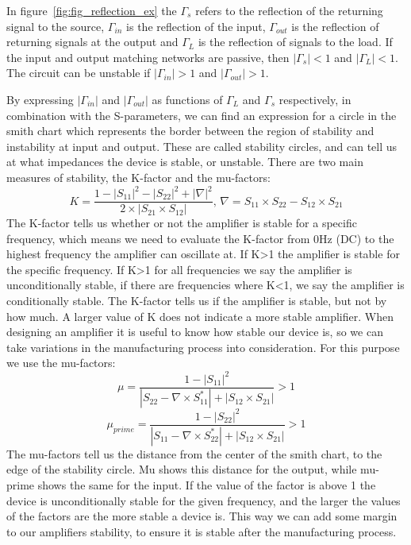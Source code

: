 In figure~\ref{fig:fig_reflection_ex} the $\Gamma_s$ refers to the reflection of the returning signal to the source, $\Gamma_{in}$ is the reflection of the input, $\Gamma_{out}$ is the reflection of returning signals at the output and $\Gamma_L$ is the reflection of signals to the load. If the input and output matching networks are passive, then $|\Gamma_s|<1$ and $|\Gamma_L|<1$. The circuit can be unstable if $|\Gamma_{in}|>1$ and $|\Gamma_{out}|>1$. 

By expressing $|\Gamma_{in}|$ and $|\Gamma_{out}|$ as functions of $\Gamma_L$  and $\Gamma_s$ respectively, in combination with the S-parameters, we can find an expression for a circle in the smith chart which represents the border between the region of stability and instability at input and output. These are called stability circles, and can tell us at what impedances the device is stable, or unstable.
There are two main measures of stability, the K-factor and the mu-factors:
\begin{equation}
K=\frac{1-|S_{11}|^2-|S_{22}|^2+|\nabla |^2}{2\times |S_{21}\times S_{12}|},\, \nabla =S_{11}\times S_{22}-S_{12}\times S_{21}
\end{equation}
The K-factor tells us whether or not the amplifier is stable for a specific frequency, which means we need to evaluate the K-factor from 0Hz (DC) to the highest frequency the amplifier can oscillate at. If K>1 the amplifier is stable for the specific frequency. If K>1 for all frequencies we say the amplifier is unconditionally stable, if there are frequencies where K<1, we say the amplifier is conditionally stable.  The K-factor tells us if the amplifier is stable, but not by how much. A larger value of K does not indicate a more stable amplifier. When designing an amplifier it is useful to know how stable our device is, so we can take variations in the manufacturing process into consideration. For this purpose we use the mu-factors:
\begin{equation}
\mu=\frac{1-|S_{11}|^2}{|S_{22}-\nabla \times S_{11}^*|+|S_{12}\times S_{21}|}>1
\end{equation}
\begin{equation}
\mu_{prime}=\frac{1-|S_{22}|^2}{|S_{11}-\nabla \times S_{22}^*|+|S_{12}\times S_{21}|}>1
\end{equation}
The mu-factors tell us the distance from the center of the smith chart, to the edge of the stability circle. Mu shows this distance for the output, while mu-prime shows the same for the input. If the value of the factor is above 1 the device is unconditionally stable for the given frequency, and the larger the values of the factors are the more stable a device is. This way we can add some margin to our amplifiers stability, to ensure it is stable after the manufacturing process.
